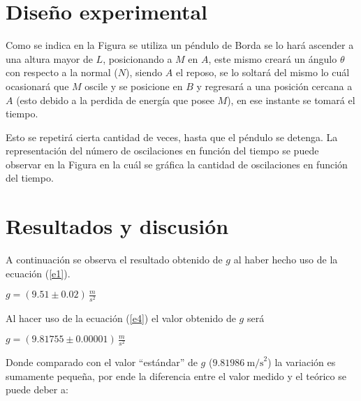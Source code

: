 \documentclass[a4paper,twocolumn]{article}
\begin{document}
\section{Diseño experimental}

Como se indica en la Figura se utiliza un péndulo de Borda\cite{b1} se lo hará ascender a una altura mayor de $L$, posicionando a $M$ en $A$, este mismo creará un ángulo $\theta$ con respecto a la normal ($N$), siendo $A$ el reposo, se lo soltará del mismo lo cuál ocasionará que $M$ oscile y se posicione en $B$ y regresará a una posición cercana a $A$ (esto debido a la perdida de energía que posee $M$), en ese instante se tomará el tiempo.

Esto se repetirá cierta cantidad de veces, hasta que el péndulo se detenga. La representación del número de oscilaciones en función del tiempo se puede observar en la Figura en la cuál se gráfica la cantidad de oscilaciones en función del tiempo.



\section{Resultados y discusión}

A continuación se observa el resultado obtenido de $g$ al haber hecho uso de la ecuación (\ref{e1}).

\begin{center}
    \begin{large}
        $g=(9.51 \pm 0.02)\,\frac{m}{s^{2}}$
    \end{large}
\end{center}

Al hacer uso de la ecuación (\ref{e4}) el valor obtenido de $g$ será

\begin{center}
    \begin{large}
        $g=(9.81755 \pm 0.00001)\,\frac{m}{s^{2}}$
    \end{large}
\end{center}

Donde comparado con el valor ``estándar'' de $g$ ($9.81986~\mathrm{m/s}^{2}$)\cite{b4} la variación es sumamente pequeña, por ende la diferencia entre el valor medido y el teórico se puede deber a:
\end{document}
